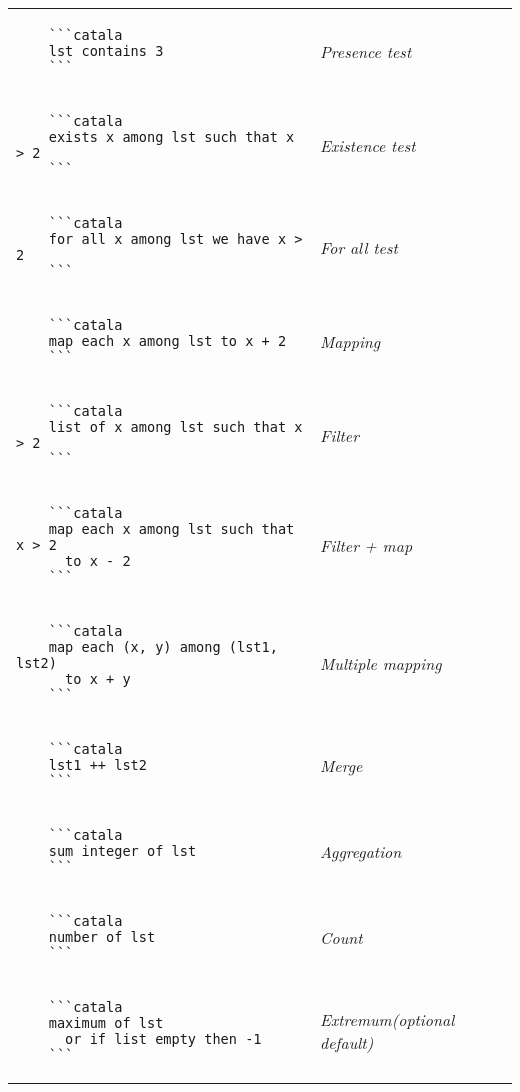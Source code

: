 \documentclass{article}
\makeatletter
\newenvironment{catala}{%
  \VerbatimEnvironment
  \let\FV@ListVSpace\relax
  \begin{verbatim}}%
 {\end{verbatim}}
\makeatother
\begin{document}
\begin{multicols}{3}
\begin{tabular}{@{}p{\cola}>{\slshape}p{\colb}@{}}
  \begin{catala}
    ```catala
    lst contains 3
    ```
  \end{catala}
  & Presence test
  \\
  \begin{catala}
    ```catala
    exists x among lst such that x > 2
    ```
  \end{catala}
  & Existence test
  \\
  \begin{catala}
    ```catala
    for all x among lst we have x > 2
    ```
  \end{catala}
  & For all test
  \\
  \begin{catala}
    ```catala
    map each x among lst to x + 2
    ```
  \end{catala}
  & Mapping
  \\
  \begin{catala}
    ```catala
    list of x among lst such that x > 2
    ```
  \end{catala}
  & Filter
  \\
  \begin{catala}
    ```catala
    map each x among lst such that x > 2
      to x - 2
    ```
  \end{catala}
  & Filter + map
  \\
  \begin{catala}
    ```catala
    map each (x, y) among (lst1, lst2)
      to x + y
    ```
  \end{catala}
  & Multiple mapping
  \\
  \begin{catala}
    ```catala
    lst1 ++ lst2
    ```
  \end{catala}
  & Merge
  \\
  \begin{catala}
    ```catala
    sum integer of lst
    ```
  \end{catala}
  & Aggregation
  \\
  \begin{catala}
    ```catala
    number of lst
    ```
  \end{catala}
  & Count
  \\
  \begin{catala}
    ```catala
    maximum of lst
      or if list empty then -1
    ```
  \end{catala}
  & Extremum\newline (optional default)

\end{tabular}
\end{multicols}
\end{document}
